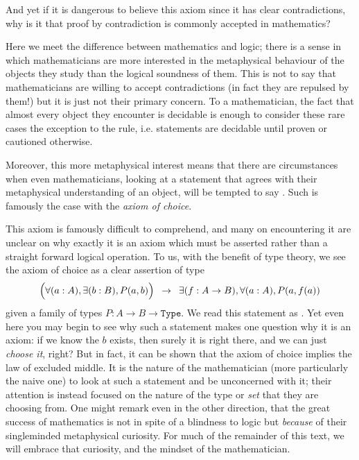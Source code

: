 \documentclass[11pt]{article}
\begin{document}
And yet if it is dangerous to believe this axiom since it has clear contradictions, why is it that proof by contradiction is commonly accepted in mathematics?

Here we meet the difference between mathematics and logic; there is a sense in which mathematicians are more interested in the metaphysical behaviour of the objects they study than the logical soundness of them. This is not to say that mathematicians are willing to accept contradictions (in fact they are repulsed by them!) but it is just not their primary concern. To a mathematician, the fact that almost every object they encounter is decidable is enough to consider these rare cases the exception to the rule, i.e. statements are decidable until proven or cautioned otherwise.

Moreover, this more metaphysical interest means that there are circumstances when even mathematicians, looking at a statement that agrees with their metaphysical understanding of an object, will be tempted to say . Such is famously the case with the \emph{axiom of choice}.

This axiom is famously difficult to comprehend, and many on encountering it are unclear on why exactly it is an axiom which must be asserted rather than a straight forward logical operation. To us, with the benefit of type theory, we see the axiom of choice as a clear assertion of type \begin{gather*}
\Big(\forall (a : A), \exists (b : B), P(a,b) \Big) \hspace{0.5em} \to \hspace{0.5em} \exists (f : A \to B), \forall (a : A), P(a,f(a))
\end{gather*}
given a family of types $P \colon A \to B \to \mathtt{Type}$. We read this statement as . Yet even here you may begin to see why such a statement makes one question why it is an axiom: if we know the $b$ exists, then surely it is right there, and we can just \emph{choose it}, right? But in fact, it can be shown that the axiom of choice implies the law of excluded middle. It is the nature of the mathematician (more particularly the naive one) to look at such a statement and be unconcerned with it; their attention is instead focused on the nature of the type or \emph{set} that they are choosing from. One might remark even in the other direction, that the great success of mathematics is not in spite of a blindness to logic but \emph{because} of their singleminded metaphysical curiosity. For much of the remainder of this text, we will embrace that curiosity, and the mindset of the mathematician.
\end{document}
